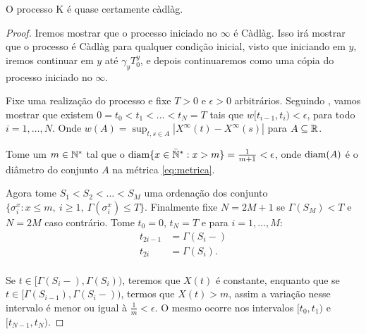 \begin{proposicao}
  \label{prop:proc-cadlag}
  O processo K é quase certamente càdlàg.
\end{proposicao}
\begin{proof}

  Iremos mostrar que o processo iniciado no $\infty$ é Càdlàg. Isso
  irá mostrar que o processo é Càdlàg para qualquer condição inicial,
  visto que iniciando em $y$, iremos continuar em $y$ até $\gamma_y
  T^y_0$, e depois continuaremos como uma cópia do processo iniciado no
  $\infty$.

  Fixe uma realização do processo e fixe $T > 0$ e $\epsilon > 0$
  arbitrários. Seguindo \cite{billingsley:99}, vamos mostrar que
  existem $0 = t_0 < t_1 < \ldots < t_N = T$ tais que $w[t_{i-1}, t_i)
  < \epsilon$, para todo $i = 1, \ldots, N$. Onde $w(A) = \sup_{t, s
    \in A} |X^\infty(t) - X^\infty(s)|$ para $A \subseteq {\mathbb{R}}$.

  Tome um $m \in {\mathbb{N^*}}$ tal que o ${\mathrm{diam}}\{x \in {\mathbb{\bar{N}^*}}: x > m \} =
  \frac{1}{m+1} < \epsilon$, onde ${\mathrm{diam}}(A)$ é o diâmetro do conjunto
  $A$ na métrica \eqref{eq:metrica}.

  Agora tome $S_1 < S_2 < \ldots < S_M$ uma ordenação dos conjunto $\{
  \sigma^x_i: x \leq m, \: i \geq 1, \: \Gamma(\sigma^x_i) \leq
  T\}$. Finalmente fixe $N = 2M+1$ se $\Gamma(S_M) < T$ e $N = 2M$
  caso contrário. Tome $t_0 = 0$, $t_N = T$ e para $i=1,\ldots, M$:
  \begin{align*}
    t_{2i-1} &= \Gamma(S_i-)\\
    t_{2i} &= \Gamma(S_i).\\
  \end{align*}

  Se $t \in [\Gamma(S_i-), \Gamma(S_i))$, teremos que
  $X(t)$ é constante, enquanto que se $t \in
  [\Gamma(S_{i-1}), \Gamma(S_{i}-))$, termos que
  $X(t) > m$, assim a variação nesse intervalo é menor ou igual
  à $\frac{1}{m} < \epsilon$. O mesmo ocorre nos intervalos $[t_0,
  t_1)$ e $[t_{N-1}, t_N)$.
\end{proof}

